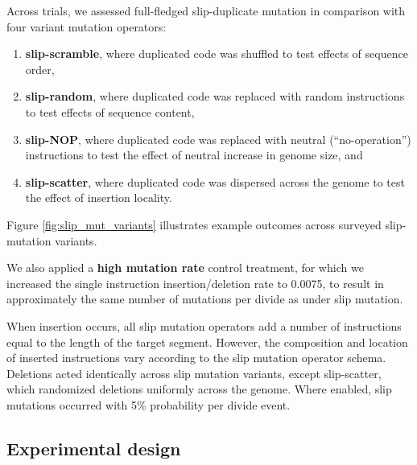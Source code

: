 Across trials, we assessed full-fledged slip-duplicate mutation in comparison with four variant mutation operators:
\begin{enumerate}
\item \textbf{slip-scramble}, where duplicated code was shuffled to test effects of sequence order,
\item \textbf{slip-random}, where duplicated code was replaced with random instructions to test effects of sequence content,
\item \textbf{slip-NOP}, where duplicated code was replaced with neutral (``no-operation'') instructions to test the effect of neutral increase in genome size, and
\item \textbf{slip-scatter}, where duplicated code was dispersed across the genome to test the effect of insertion locality.
\end{enumerate}
Figure \ref{fig:slip_mut_variants} illustrates example outcomes across surveyed slip-mutation variants.

We also applied a \textbf{high mutation rate} control treatment, for which we increased the single instruction insertion/deletion rate to 0.0075, to result in approximately the same number of mutations per divide as under slip mutation.

When insertion occurs, all slip mutation operators add a number of instructions equal to the length of the target segment.
However, the composition and location of inserted instructions vary according to the slip mutation operator schema.
Deletions acted identically across slip mutation variants, except slip-scatter, which randomized deletions uniformly across the genome.
Where enabled, slip mutations occurred with 5\% probability per divide event.

\subsection{Experimental design}

